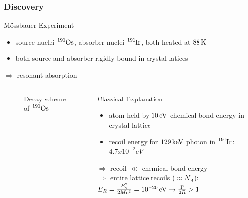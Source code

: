 	\begin{frame}
		\frametitle{Discovery}
		
		\fontsize{9.5pt}{10pt}
		\begin{block}{Mössbauer Experiment}
			\begin{itemize}
				\item source nuclei $\ce{^{191}Os}$, absorber nuclei $\ce{^{191}Ir}$, both heated at $\unit[88]{K}$
				\item both source and absorber rigidly bound in crystal latices
			\end{itemize}
		$\Rightarrow$ resonant absorption
		\end{block}
	
		\begin{columns}
			\begin{column}{0.49\linewidth}
				\begin{figure}
					\sansmath
					\centering
					\caption{Decay scheme of $\ce{^{191}Os}$ \cite{longyang07}}
				\end{figure}
			\end{column}
		
			\begin{column}{0.48\linewidth}
				\fontsize{9.5pt}{11pt}
				\begin{block}{Classical Explanation}
					\begin{itemize}
						\item atom held by $\unit[10]{eV}$ chemical bond energy in crystal lattice
						\item recoil energy for $\unit[129]{keV}$ photon in $\ce{^{191}Ir}$: $\unit{4.7 x 10^{-2}}{eV}$
					\end{itemize}
					$\Rightarrow$ recoil $\ll$ chemical bond energy\\
					$\Rightarrow$ entire lattice recoils ($\approx N_A$):
					$E_R=\frac{E_{\gamma}^2}{2Mc^2}=\unit[10^{-20}]{eV} \rightarrow \frac{\Gamma}{2R} > 1$
				\end{block}
			\end{column}
		\end{columns}
	\end{frame}
	
